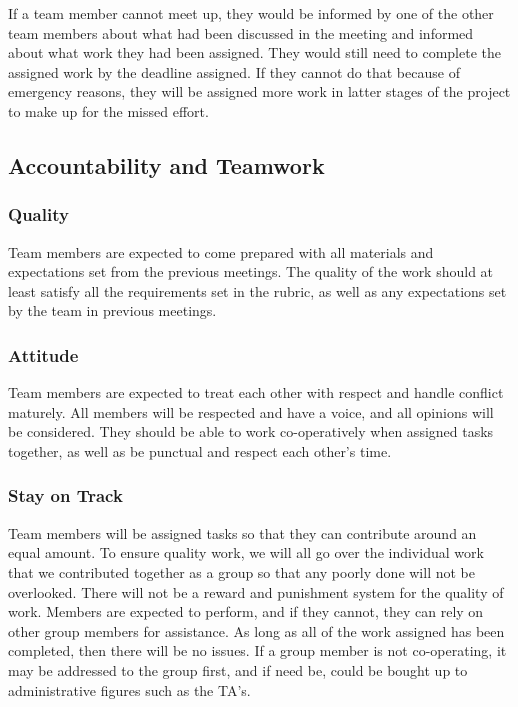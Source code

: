 \documentclass{article}
\begin{document}
If a team member cannot meet up, they would be informed by one of the other team members about what had been discussed in the meeting and informed about what work they had been assigned. They would still need to complete the assigned work by the deadline assigned. If they cannot do that because of emergency reasons, they will be assigned more work in latter stages of the project to make up for the missed effort. 

\subsection*{Accountability and Teamwork}

\subsubsection*{Quality} 

Team members are expected to come prepared with all materials and expectations set from the previous meetings. The quality of the work should at least satisfy all the requirements set in the rubric, as well as any expectations set by the team in previous meetings. 

\subsubsection*{Attitude}

Team members are expected to treat each other with respect and handle conflict maturely. All members will be respected and have a voice, and all opinions will be considered. They should be able to work co-operatively when assigned tasks together, as well as be punctual and respect each other’s time. 

\subsubsection*{Stay on Track}

Team members will be assigned tasks so that they can contribute around an equal amount. To ensure quality work, we will all go over the individual work that we contributed together as a group so that any poorly done will not be overlooked. There will not be a reward and punishment system for the quality of work. Members are expected to perform, and if they cannot, they can rely on other group members for assistance. As long as all of the work assigned has been completed, then there will be no issues. If a group member is not co-operating, it may be addressed to the group first, and if need be, could be bought up to administrative figures such as the TA’s. 
\end{document}
